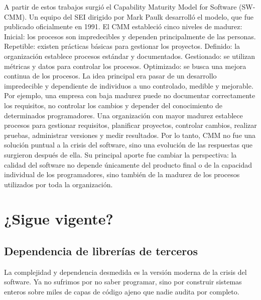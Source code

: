 \documentclass{./plantilla/umss}
\begin{document}
A partir de estos trabajos surgió el Capability Maturity Model for Software (SW-CMM). Un equipo del SEI dirigido por Mark Paulk desarrolló el modelo, que fue publicado oficialmente en 1991.
El CMM estableció cinco niveles de madurez:
Inicial: los procesos son impredecibles y dependen principalmente de las personas.
Repetible: existen prácticas básicas para gestionar los proyectos.
Definido: la organización establece procesos estándar y documentados.
Gestionado: se utilizan métricas y datos para controlar los procesos.
Optimizado: se busca una mejora continua de los procesos.
La idea principal era pasar de un desarrollo impredecible y dependiente de individuos a uno controlado, medible y mejorable.
Por ejemplo, una empresa con baja madurez puede no documentar correctamente los requisitos, no controlar los cambios y depender del conocimiento de determinados programadores. Una organización con mayor madurez establece procesos para gestionar requisitos, planificar proyectos, controlar cambios, realizar pruebas, administrar versiones y medir resultados.
Por lo tanto, CMM no fue una solución puntual a la crisis del software, sino una evolución de las respuestas que surgieron después de ella. Su principal aporte fue cambiar la perspectiva: la calidad del software no depende únicamente del producto final o de la capacidad individual de los programadores, sino también de la madurez de los procesos utilizados por toda la organización.

\section{¿Sigue vigente?}

\subsection{Dependencia de librerías de terceros}

La complejidad y dependencia desmedida es la versión moderna de la crisis del software. Ya no sufrimos por no saber programar, sino por construir sistemas enteros sobre miles de capas de código ajeno que nadie audita por completo.
\end{document}
